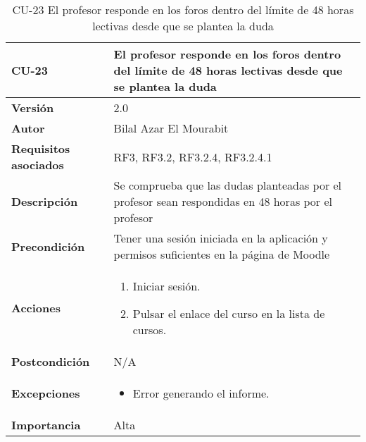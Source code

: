 \begin{table}[H]
	\centering
	\begin{tabularx}{\linewidth}{ p{} p{} }
		\toprule
		\textbf{CU-23}    & \textbf{El profesor responde en los foros dentro del límite de 48 horas lectivas desde que se plantea la duda}\\
		\toprule
		\textbf{Versión}              & 2.0    \\
		\textbf{Autor}                & Bilal Azar El Mourabit \\
		\textbf{Requisitos asociados} & RF3, RF3.2, RF3.2.4, RF3.2.4.1 \\
		\textbf{Descripción}          & Se comprueba que las dudas planteadas por el profesor sean respondidas en 48 horas por el profesor\\
    		\textbf{Precondición}         & Tener una sesión iniciada en la aplicación y permisos suficientes en la página de Moodle\\
		\textbf{Acciones}             & 
		\begin{enumerate}
			\def\labelenumi{\arabic{enumi}.}
			\tightlist
			\item Iniciar sesión.
            \item Pulsar el enlace del curso en la lista de cursos. 
		\end{enumerate}\\
		\textbf{Postcondición}        & N/A \\
		\textbf{Excepciones}          & \begin{itemize}
		    \item Error generando el informe.
		\end{itemize} \\
		\textbf{Importancia}          & Alta \\
		\bottomrule
	\end{tabularx}
	\caption{CU-23 El profesor responde en los foros dentro del
límite de 48 horas lectivas desde que se plantea la duda}
\end{table}

